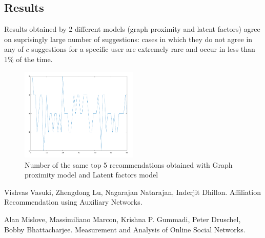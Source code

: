\documentclass[twoside,twocolumn]{article}
\begin{document}
\subsection{Results}

Results obtained by 2 different models (graph proximity and latent factors) agree on suprisingly large number of suggestions: cases in which they do not agree in any of $c$ suggestions for a specific user are extremely rare and occur in less than $1\%$ of the time.


\begin{figure}[h]
	\centering
	\includegraphics[width=0.5\textwidth]{latent_katzC_sim}
	\caption{Number of the same top 5 recommendations obtained with Graph proximity model and Latent factors model}
	\label{pic1}
\end{figure}

\pagebreak
\begin{thebibliography}{99} %

Vishvas Vasuki, Zhengdong Lu, Nagarajan Natarajan, Inderjit Dhillon.
\newblock Affiliation Recommendation using Auxiliary Networks.

Alan Mislove, Massimiliano Marcon, Krishna P. Gummadi, Peter Druschel, Bobby Bhattacharjee.
\newblock Measurement and Analysis of Online Social Networks.



\end{thebibliography}

\end{document}
